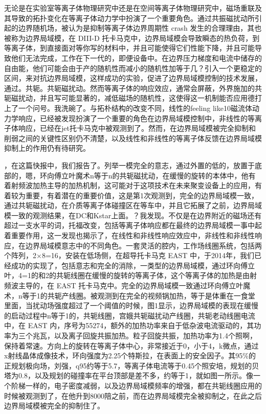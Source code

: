 无论是在实验室等离子体物理研究中还是在空间等离子体物理研究中，磁场重联及其导致的拓扑变化在等离子体动力学中扮演了一个重要角色。通过共振磁扰动所引起的边界随机场，被认为是抑制等离子体边界周期性 crash 发生的合理理由，其也被称为边界局域模，在 DIII-D 托卡马克中，边界局域模会导致瞬态的热负荷，到等离子体，到直接面对等你写的材料中，并且可能使得它们性能下降，并且可能导致他们无法完成，工作在下一代的，即便设备中。在边界压力梯度和电流中储存的自由能，他们可能会由于产的随机性而减小的随机性加等于几？引入一个更稳定的区间，来对抗边界局域模，这样成功的实验，促进了边界局域模控制的技术发展，通过。共轭。共轭磁扰动。然而等离子体的响应效应，通常会屏蔽，外界施加的共轭磁扰动，并且写可能显著的，减低磁场的随机性，这使得这一机制能否应用德打上了一个问号。我洗碗了。与拓朴结构的改变不同，线性的feeling like10磁流体动力学响应，已经被发现扮演了一个重要的角色在边界局域模控制中，非线性的等离子体响应，已经在jet托卡马克中被观测到了。然而，在边界局域模被完全抑制和削弱之间的关键性区别仍不清楚，以及线性和非线性的等离子体反馈在边界局域模抑制上的作用仍有待研究。

，在这篇快报中，我们报告了。列举一模完全的意志，通过外置的低的，放置于底部的，嗯，环向傅立叶魔术n等于n的共轭磁扰动，在缓慢的旋转的本体中，他有着射频波加热主导的加热机制，这可能对于这项技术在未来聚变设备上的应用，有着较为重要，有着潜在的重要价值，这是第1次观测到，完全的边界局域模一致，通过共轭磁扰动，在介质等离子体碰撞区在等车中，并且它拓展了之前，边界局域模一致的观测结果，在DC和Kstar上面。？我发现。不仅是在边界附近的磁场还有超过一支水平的词，托福改变，包括等离子体响应都在最终的边界局域模一事中起着重要作用，这一发现也揭示了，在线性和非线性响应效应中，非线性和非线性响应，在边界局域模意志中的不同角色。一套灵活的腔内，工作场线圈系统，包括两个阵列，2×8=16，安装在低场侧，在超导托卡马克 EAST 中，于2014年，我们已经成功的实现了，包括意志和完全的消除，一类型的边界局域模，通过环向傅立叶，4=1的和2的共轭线圈在缓慢的旋转的等离子体，这个等离子体的加热是由射频波主导的，在 EAST 托卡马克中。完全的边界局域模一致通过环向傅立叶魔术，n等于1的共轭产线圈。被观测到在完全的视频锅加热，等于是体重在一食堂里面，当扰动场强度超过了一个阈值的时候，图1显示，边界局域模的表现在缓慢的启动过程中n等于1的，共轭线圈，宫娥共轭磁扰动产线圈，共轭老动线圈电流中，在 EAST 内，序号为55274，额外的加热功率来自于低杂波电流驱动的，其功率为三个兆瓦，以及离子回旋共振加热。粒子回旋共振，加热功率为1.4个照啊，保持着常速。方向上的旋转在等离子体中心，非常接近于0，小于4，k微点，通过x射线晶体成像技术，环向强度为2.25个特斯拉，在表面上的安全因子。其95\%的正规划极向场，刘强，q95约等于5.7，等离子体电流等于0.45个照安培，规划的贝塔为0.8，以及规划的碰撞率在平台顶部是差不多，约等于1，就如图一所示。像一个阶梯一样的，电子密度减弱，以及边界局域模频率的增强，都在共轭线圈应用的时候被观测到了，在他升到8000陪之前，而在边界局域模完全被抑制之，在此之后边界局域模被完全的抑制住了。

